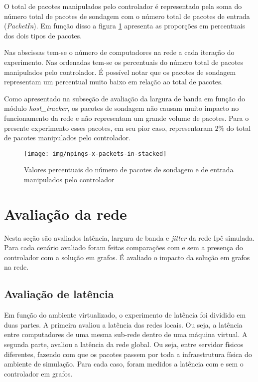 O total de pacotes manipulados pelo controlador é representado pela soma
do número total de pacotes de sondagem com o número total de pacotes de
entrada (\emph{PacketIn}).
Em função disso a figura \ref{fig:npings-x-packets-in-stacked} apresenta
as proporções em percentuais dos dois tipos de pacotes.

Nas abscissas tem-se o número de computadores na rede a cada iteração do
experimento.
Nas ordenadas tem-se os percentuais do número total de pacotes manipulados
pelo controlador.
É possível notar que os pacotes de sondagem representam um percentual muito
baixo em relação ao total de pacotes.

Como apresentado na subseção de avaliação da largura de banda em função do
módulo \emph{host\_tracker}, os pacotes de sondagem não causam muito impacto
no funcionamento da rede e não representam um grande volume de pacotes.
Para o presente experimento esses pacotes, em seu pior caso, representaram
$2\%$ do total de pacotes manipulados pelo controlador.

\begin{figure}[!htb]
    \centering
    \label{fig:npings-x-packets-in-stacked}
    \texttt{[image: img/npings-x-packets-in-stacked]}
    \caption{Valores percentuais do número de pacotes de sondagem e de
        entrada manipulados pelo controlador}
\end{figure}

\section{Avaliação da rede}

Nesta seção são avaliados latência, largura de banda e \emph{jitter} da
rede Ipê simulada.
Para cada cenário avaliado foram feitas comparações com e sem a presença
do controlador com a solução em grafos.
É avaliado o impacto da solução em grafos na rede.

\subsection{Avaliação de latência}

Em função do ambiente virtualizado, o experimento de latência foi dividido em
duas partes.
A primeira avaliou a latência das redes locais.
Ou seja, a latência entre computadores de uma mesma sub-rede dentro de uma
máquina virtual.
A segunda parte, avaliou a latência da rede global.
Ou seja, entre servidor físicos diferentes, fazendo com que os pacotes
passem por toda a infraestrutura física do ambiente de simulação.
Para cada caso, foram medidos a latência com e sem o controlador em grafos.


